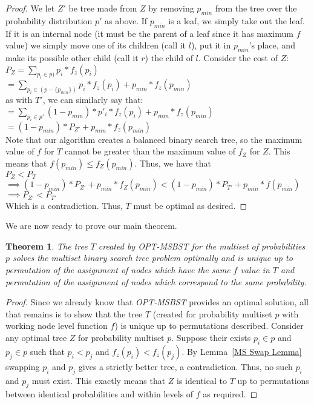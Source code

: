 \documentclass[letterpaper,12pt,titlepage,oneside,final]{book}
\theoremstyle{plain}
\newtheorem{thm}{Theorem}[section]
\begin{document}
\begin{proof}
We let $Z'$ be tree made from $Z$ by removing $p_{min}$ from the tree over the probability distribution $p'$ as above. If $p_{min}$ is a leaf, we simply take out the leaf. If it is an internal node (it must be the parent of a leaf since it has maximum $f$ value) we simply move one of its children (call it $l$), put it in $p_{min}$'s place, and make its possible other child (call it $r$) the child of $l$. Consider the cost of $Z$: \\
$P_Z = \sum_{p_i \in p)} p_i*f_z(p_i)$ \\
$= \sum_{p_i \in (p - \{p_{min}\})} p_i*f_z(p_i) + p_{min}*f_z(p_{min})$ \\
as with $T'$, we can similarly say that: \\
$= \sum_{p_i \in p'} (1-p_{min})*p'_i*f_z(p_i) + p_{min}*f_z(p_{min})$ \\
$= (1-p_{min})*P_{Z'} + p_{min}*f_z(p_{min})$ \\

Note that our algorithm creates a balanced binary search tree, so the maximum value of $f$ for $T$ cannot be greater than the maximum value of $f_Z$ for $Z$. This means that $f(p_{min}) \leq f_Z(p_{min})$. Thus, we have that \\
$P_Z < P_T$ \\
$\implies (1-p_{min})*P_{Z'} + p_{min}*f_Z(p_{min}) < (1-p_{min})*P_{T'} + p_{min}*f(p_{min})$ \\
$\implies P_{Z'} < P_{T'}$ \\
Which is a contradiction. Thus, $T$ must be optimal as desired.


\end{proof}

We are now ready to prove our main theorem.

\begin{thm}
The tree $T$ created by \textit{OPT-MSBST} for the multiset of probabilities $p$ solves the multiset binary search tree problem optimally and is unique up to permutation of the assignment of nodes which have the same $f$ value in $T$ and permutation of the assignment of nodes which correspond to the same probability.
\end{thm}

\begin{proof}
Since we already know that \textit{OPT-MSBST} provides an optimal solution, all that remains is to show that the tree $T$ (created for probability multiset $p$ with working node level function $f$) is unique up to permutations described. Consider any optimal tree $Z$ for probability multiset $p$. Suppose their exists $p_i \in p$ and $p_j \in p$ such that $p_i < p_j$ and $f_z(p_i) < f_z(p_j)$. By Lemma~\ref{MS Swap Lemma} swapping $p_i$ and $p_j$ gives a strictly better tree, a contradiction. Thus, no such $p_i$ and $p_j$ must exist. This exactly means that $Z$ is identical to $T$ up to permutations between identical probabilities and within levels of $f$ as required.
\end{proof}
\end{document}
